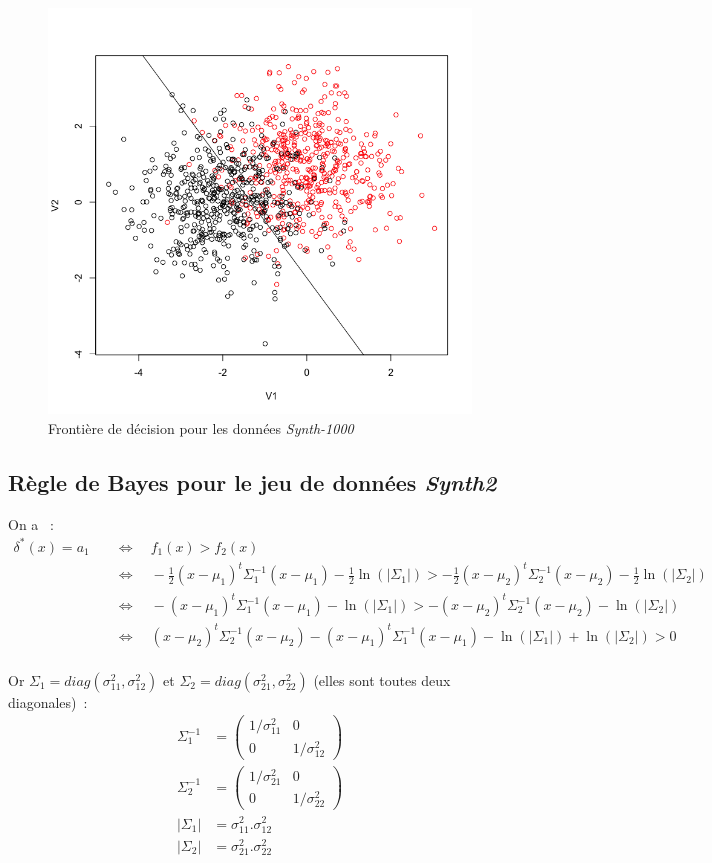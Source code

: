 \documentclass[a4paper,10pt]{report}
\begin{document}
\begin{figure}[H]
	\centering
	\captionsetup{justification=centering, margin=4cm}
	\includegraphics[width=.5\linewidth]{img/3-2-1-front-dec-euc-Synth1}
	\caption{\small Frontière de décision pour les données \textit{Synth-1000}}	
	\label{fig:3-2-1-front-dec-euc-Synth1}%
\end{figure}


\subsection{Règle de Bayes pour le jeu de données \textit{Synth2}}

On a ~:
\begin{align*}
\delta^*(x) = a_1 \quad 
&\Leftrightarrow \quad f_1(x) > f_2(x) \\
&\Leftrightarrow \quad -\frac{1}{2} (x - \mu_1)^t \Sigma_1^{-1} (x - \mu_1) - \frac{1}{2}\ln(|\Sigma_1|) > -\frac{1}{2} (x - \mu_2)^t \Sigma_2^{-1} (x - \mu_2)  -\frac{1}{2} \ln(|\Sigma_2|) \\
&\Leftrightarrow \quad - (x - \mu_1)^t \Sigma_1^{-1} (x - \mu_1) - \ln(|\Sigma_1|) > - (x - \mu_2)^t \Sigma_2^{-1} (x - \mu_2)  - \ln(|\Sigma_2|) \\
&\Leftrightarrow \quad (x - \mu_2)^t \Sigma_2^{-1} (x - \mu_2) - (x - \mu_1)^t \Sigma_1^{-1} (x - \mu_1) - \ln(|\Sigma_1|) + \ln(|\Sigma_2|) > 0 \\
\end{align*}

Or $\Sigma_{1} = diag(\sigma_{11}^2, \sigma_{12}^2)$ et $\Sigma_{2} = diag(\sigma_{21}^2, \sigma_{22}^2)$ (elles sont toutes deux diagonales)~:
\begin{align*}
\Sigma_{1}^{-1} &= \begin{pmatrix} 1/\sigma_{11}^2 & 0 \\ 0 & 1/\sigma_{12}^2 \end{pmatrix} \\
\Sigma_{2}^{-1} &= \begin{pmatrix} 1/\sigma_{21}^2 & 0 \\ 0 & 1/\sigma_{22}^2 \end{pmatrix} \\
|\Sigma_1| &= \sigma_{11}^2 . \sigma_{12}^2  \\
|\Sigma_2| &= \sigma_{21}^2 . \sigma_{22}^2  \\
\end{align*}
\end{document}
